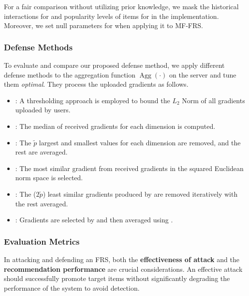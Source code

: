 For a fair comparison without utilizing prior knowledge, we mask the historical interactions for \FRA{} and popularity levels of items for \PIP{} in the implementation. Moreover, we set null parameters for \ARA{} when applying it to MF-FRS. 

\subsubsection{Defense Methods}
\label{sssec:defense_methods}

To evaluate \model{} and compare our proposed defense method, we apply different defense methods to the aggregation function $\operatorname{Agg}(\cdot)$ on the server and tune them \emph{optimal}. They process the uploaded gradients as follows.

\begin{itemize}[leftmargin=*]

\item \NB{} \cite{NormBound}: A thresholding approach is employed to bound the $L_2$ Norm of all gradients uploaded by users.

\item \MEDIAN{} \cite{Media-TrimmedMean}: The median of received gradients for each dimension is computed.

\item \TMEAN{} \cite{Media-TrimmedMean}: The $\tilde{p}$ largest and smallest values for each dimension are removed, and the rest are averaged.

\item \KRUM{} \cite{Krum-MultiKrum}: The most similar gradient from received gradients in the squared Euclidean norm space is selected. 

\item \MKRUM{} \cite{Krum-MultiKrum}: The ($2\tilde{p}$) least similar gradients produced by \KRUM{} are removed iteratively with the rest averaged.

\item \BULYAN{} \cite{Bulyan}: Gradients are selected by \MKRUM{} and then averaged using \TMEAN{}.

\end{itemize}

\subsubsection{Evaluation Metrics} \label{ssec:evaluation_metrics}
In attacking and defending an FRS, both the \textbf{effectiveness of attack} and the \textbf{recommendation performance} are crucial considerations. An effective attack should successfully promote target items without significantly degrading the performance of the system to avoid detection.

